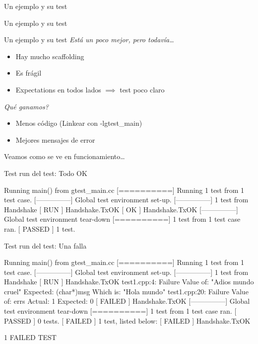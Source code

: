 \begin{frame}[shrink=2]{Un ejemplo y su test}

\end{frame}


\begin{frame}[shrink=2]{Un ejemplo y su test}

\end{frame}


\begin{frame}{Un ejemplo y su test}
\textit{Est\'a un poco mejor, pero todav\'ia\ldots}
\begin{itemize}
	\item Hay mucho scaffolding
	\item Es fr\'agil
	\item Expectations en todos lados $\implies$ test poco claro
\end{itemize}
\bigskip
\textit{\textquestiondown Qu\'e ganamos?}
\begin{itemize}
	\item Menos c\'odigo (Linkear con -lgtest\_main)
	\item Mejores mensajes de error
\end{itemize}
\bigskip
\alert{Veamos como se ve en funcionamiento\ldots}
\end{frame}


\begin{frame}[fragile]{Test run del test: Todo OK}
\begin{semiverbatim}
Running main() from gtest_main.cc
{\color[rgb]{0,1,0}[==========]} Running 1 test from 1 test case.
{\color[rgb]{0,1,0}[---------------]} Global test environment set-up.
{\color[rgb]{0,1,0}[---------------]} 1 test from Handshake
{\color[rgb]{0,1,0}[ RUN      ]} Handshake.TxOK
{\color[rgb]{0,1,0}[       OK ]} Handshake.TxOK
{\color[rgb]{0,1,0}[---------------]} Global test environment tear-down
{\color[rgb]{0,1,0}[==========]} 1 test from 1 test case ran.
{\color[rgb]{0,1,0}[  PASSED  ]} 1 test.
\end{semiverbatim}
\end{frame}

\begin{frame}[shrink=2,fragile]{Test run del test: Una falla}
\begin{semiverbatim}
Running main() from gtest_main.cc
{\color[rgb]{0,1,0}[==========]} Running 1 test from 1 test case.
{\color[rgb]{0,1,0}[---------------]} Global test environment set-up.
{\color[rgb]{0,1,0}[---------------]} 1 test from Handshake
{\color[rgb]{0,1,0}[ RUN      ]} Handshake.TxOK
test1.cpp:4: Failure
Value of: "Adios mundo cruel"
Expected: (char*)msg
Which is: "Hola mundo"
test1.cpp:20: Failure
Value of: errs
  Actual: 1
Expected: 0
{\color[rgb]{1,0,0}[  FAILED  ]} Handshake.TxOK
{\color[rgb]{0,1,0}[---------------]} Global test environment tear-down
{\color[rgb]{0,1,0}[==========]} 1 test from 1 test case ran.
{\color[rgb]{0,1,0}[  PASSED  ]} 0 tests.
{\color[rgb]{1,0,0}[  FAILED  ]} 1 test, listed below:
{\color[rgb]{1,0,0}[  FAILED  ]} Handshake.TxOK

 1 FAILED TEST
\end{semiverbatim}
\end{frame}


